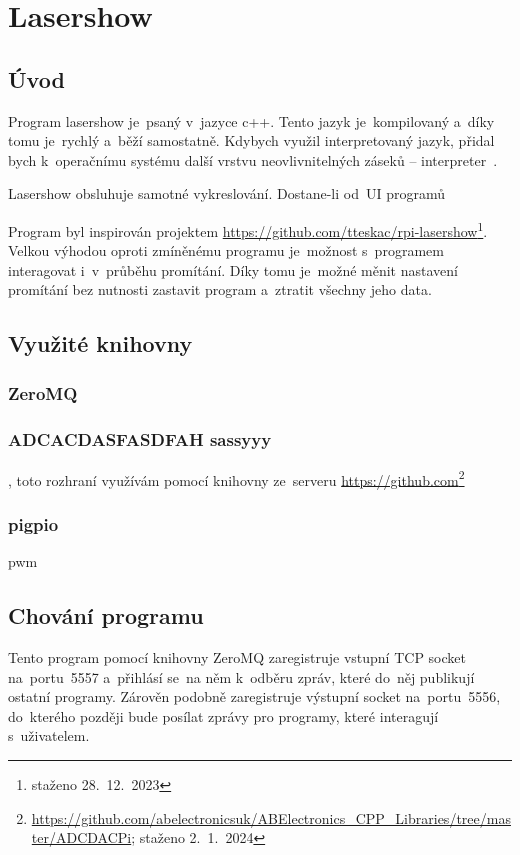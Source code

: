 \section{Lasershow}
\subsection{Úvod}

Program lasershow je~psaný v~jazyce c++. Tento jazyk je~kompilovaný a~díky tomu je~rychlý a~běží samostatně.
Kdybych využil interpretovaný jazyk, přidal bych k~operačnímu systému další vrstvu neovlivnitelných záseků -- interpreter~\cite{wiki-interpret}.

Lasershow obsluhuje samotné vykreslování. Dostane-li od~UI programů 

Program byl inspirován projektem \url{https://github.com/tteskac/rpi-lasershow}\footnote{staženo 28.~12.~2023}.
Velkou výhodou oproti zmíněnému programu je~možnost s~programem interagovat i~v~průběhu promítání. Díky tomu je~možné měnit nastavení promítání bez nutnosti zastavit program a~ztratit všechny jeho data.

\subsection{Využité knihovny}
\subsubsection{ZeroMQ}
\subsubsection{ADCACDASFASDFAH sassyyy}
, toto rozhraní využívám pomocí knihovny ze~serveru \url{https://github.com}\footnote{\url{https://github.com/abelectronicsuk/ABElectronics_CPP_Libraries/tree/master/ADCDACPi}; staženo 2.~1.~2024}
\subsubsection{pigpio}
pwm

\subsection{Chování programu}
Tento program pomocí knihovny ZeroMQ zaregistruje vstupní TCP socket na~portu~5557 a~přihlásí se~na něm k~odběru zpráv, které do~něj publikují ostatní programy. Zárověn podobně zaregistruje výstupní socket na~portu~5556, do~kterého později bude posílat zprávy pro programy, které interagují s~uživatelem.


